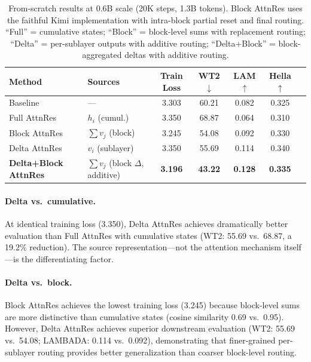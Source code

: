 \documentclass{article}
\begin{document}
\begin{table}[h]
\centering
\caption{From-scratch results at 0.6B scale (20K steps, 1.3B tokens). Block AttnRes uses the faithful Kimi implementation with intra-block partial reset and final routing. ``Full'' = cumulative states; ``Block'' = block-level sums with replacement routing; ``Delta'' = per-sublayer outputs with additive routing; ``Delta+Block'' = block-aggregated deltas with additive routing.}
\label{tab:scratch_0.6b}
\begin{tabular}{llccccc}
\toprule
\textbf{Method} & \textbf{Sources} & \textbf{Train Loss} & \textbf{WT2 $\downarrow$} & \textbf{LAM $\uparrow$} & \textbf{Hella $\uparrow$} \\
\midrule
Baseline & --- & 3.303 & 60.21 & 0.082 & 0.325 \\
\midrule
Full AttnRes & $h_i$ (cumul.) & 3.350 & 68.87 & 0.064 & 0.310 \\
Block AttnRes & $\sum v_j$ (block) & 3.245 & 54.08 & 0.092 & 0.330 \\
Delta AttnRes & $v_i$ (sublayer) & 3.350 & 55.69 & 0.114 & 0.340 \\
\textbf{Delta+Block AttnRes} & $\sum v_j$ (block $\Delta$, additive) & \textbf{3.196} & \textbf{43.22} & \textbf{0.128} & \textbf{0.335} \\
\bottomrule
\end{tabular}
\end{table}

\paragraph{Delta vs.\ cumulative.} At identical training loss (3.350), Delta AttnRes achieves dramatically better evaluation than Full AttnRes with cumulative states (WT2: 55.69 vs.\ 68.87, a 19.2\% reduction). The source representation---not the attention mechanism itself---is the differentiating factor.

\paragraph{Delta vs.\ block.} Block AttnRes achieves the lowest training loss (3.245) because block-level sums are more distinctive than cumulative states (cosine similarity 0.69 vs.\ 0.95). However, Delta AttnRes achieves superior downstream evaluation (WT2: 55.69 vs.\ 54.08; LAMBADA: 0.114 vs.\ 0.092), demonstrating that finer-grained per-sublayer routing provides better generalization than coarser block-level routing.
\end{document}
